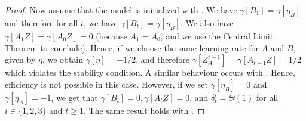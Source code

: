\begin{proof}
Now assume that the model is initialized with . We have $\gamma[B_1] = \gamma[\eta_B]$ and therefore for all $t$, we have $\gamma[B_t] = \gamma[\eta_B]$. We also have $\gamma[A_1 \underbar{Z}] = \gamma[A_0 \underbar{Z}] = 0$ (because $A_1 = A_0$, and we use the Central Limit Theorem to conclude). Hence, if we choose the same learning rate for $A$ and $B$, given by $\eta$, we obtain $\gamma[\eta] = -1/2$, and therefore $\gamma[Z_A^{t-1}] = \gamma[A_{t-1} \underbar{Z}] = 1/2$ which violates the stability condition. A similar behaviour occurs with . Hence, efficiency is not possible in this case. However, if we set $\gamma[\eta_B] = 0$ and $\gamma[\eta_A] = -1$, we get that $\gamma[B_t] = 0, \gamma[A_t \underbar{Z}] = 0$, and $\delta_t^i = \Theta(1)$ for all $i\in \{1,2,3\}$ and $t\geq 1$. The same result holds with . 

\end{proof}
